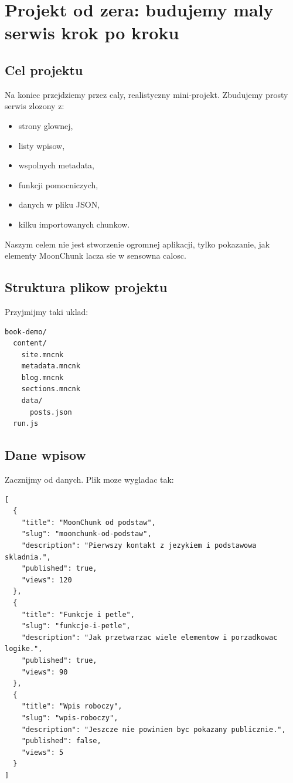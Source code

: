 \chapter{Projekt od zera: budujemy maly serwis krok po kroku}

\section{Cel projektu}
Na koniec przejdziemy przez caly, realistyczny mini-projekt. Zbudujemy prosty serwis
zlozony z:

\begin{itemize}
  \item strony glownej,
  \item listy wpisow,
  \item wspolnych metadata,
  \item funkcji pomocniczych,
  \item danych w pliku JSON,
  \item kilku importowanych chunkow.
\end{itemize}

Naszym celem nie jest stworzenie ogromnej aplikacji, tylko pokazanie, jak elementy
MoonChunk lacza sie w sensowna calosc.

\section{Struktura plikow projektu}
Przyjmijmy taki uklad:

\begin{lstlisting}[style=basecode,caption={Struktura przykladowego projektu}]
book-demo/
  content/
    site.mncnk
    metadata.mncnk
    blog.mncnk
    sections.mncnk
    data/
      posts.json
  run.js
\end{lstlisting}

\section{Dane wpisow}
Zacznijmy od danych. Plik  moze wygladac tak:

\begin{lstlisting}[style=basecode,caption={Przykladowy plik posts.json}]
[
  {
    "title": "MoonChunk od podstaw",
    "slug": "moonchunk-od-podstaw",
    "description": "Pierwszy kontakt z jezykiem i podstawowa skladnia.",
    "published": true,
    "views": 120
  },
  {
    "title": "Funkcje i petle",
    "slug": "funkcje-i-petle",
    "description": "Jak przetwarzac wiele elementow i porzadkowac logike.",
    "published": true,
    "views": 90
  },
  {
    "title": "Wpis roboczy",
    "slug": "wpis-roboczy",
    "description": "Jeszcze nie powinien byc pokazany publicznie.",
    "published": false,
    "views": 5
  }
]
\end{lstlisting}

